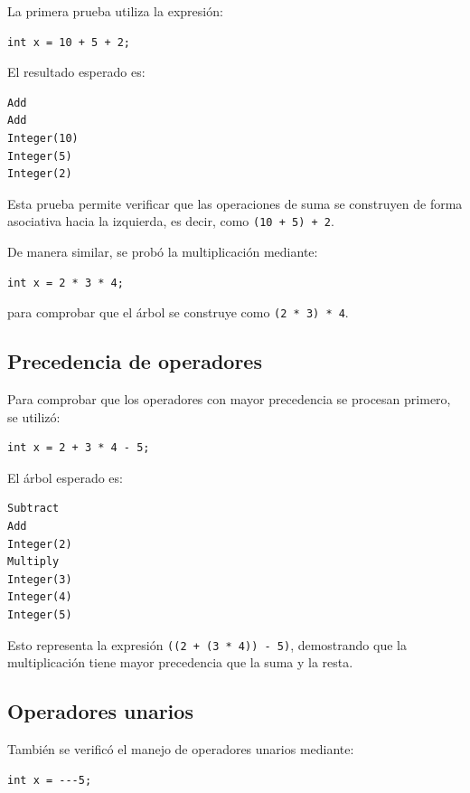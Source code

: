 \documentclass[12pt,letterpaper]{article}
\begin{document}
La primera prueba utiliza la expresión:

\begin{verbatim}
int x = 10 + 5 + 2;
\end{verbatim}

El resultado esperado es:

\begin{verbatim}
Add
Add
Integer(10)
Integer(5)
Integer(2)
\end{verbatim}

Esta prueba permite verificar que las operaciones de suma se construyen de forma asociativa hacia la izquierda, es decir, como \texttt{(10 + 5) + 2}.

De manera similar, se probó la multiplicación mediante:

\begin{verbatim}
int x = 2 * 3 * 4;
\end{verbatim}

para comprobar que el árbol se construye como \texttt{(2 * 3) * 4}.

\subsection*{Precedencia de operadores}

Para comprobar que los operadores con mayor precedencia se procesan primero, se utilizó:

\begin{verbatim}
int x = 2 + 3 * 4 - 5;
\end{verbatim}

El árbol esperado es:

\begin{verbatim}
Subtract
Add
Integer(2)
Multiply
Integer(3)
Integer(4)
Integer(5)
\end{verbatim}

Esto representa la expresión \texttt{((2 + (3 * 4)) - 5)}, demostrando que la multiplicación tiene mayor precedencia que la suma y la resta.

\subsection*{Operadores unarios}

También se verificó el manejo de operadores unarios mediante:

\begin{verbatim}
int x = ---5;
\end{verbatim}
\end{document}
